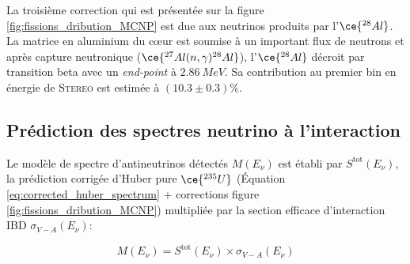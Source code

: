 La troisième correction qui est présentée sur la figure \ref{fig:fissions_dribution_MCNP} est due aux neutrinos produits par l'$\ce{^{28}Al}$. La matrice en aluminium du c\oe ur est soumise à un important flux de neutrons et après capture neutronique ($\ce{^{27}Al(n,\gamma)^{28}Al}$), l'$\ce{^{28}Al}$ décroit par transition beta avec un \textit{end-point} à $\SI{2.86}{MeV}$. Sa contribution au premier bin en énergie de \textsc{Stereo} est estimée à $(10.3 \pm 0.3) \%$.\\







\bigbreak


\bigbreak

\subsection{Prédiction des spectres neutrino à l'interaction}
\label{sec:nu_interaction}

Le modèle de spectre d'antineutrinos détectés $M(E_\nu)$ est établi par $S^\textrm{tot}(E_\nu)$, la prédiction corrigée d'Huber pure $\ce{^{235}U}$ (Équation \ref{eq:corrected_huber_spectrum} + corrections figure \ref{fig:fissions_dribution_MCNP}) multipliée par la section efficace d'interaction IBD $\sigma_{V-A}(E_\nu)$:

\begin{equation}
    M(E_\nu) = S^\textrm{tot}(E_\nu) \times \sigma_{V-A}(E_\nu)
\end{equation}

